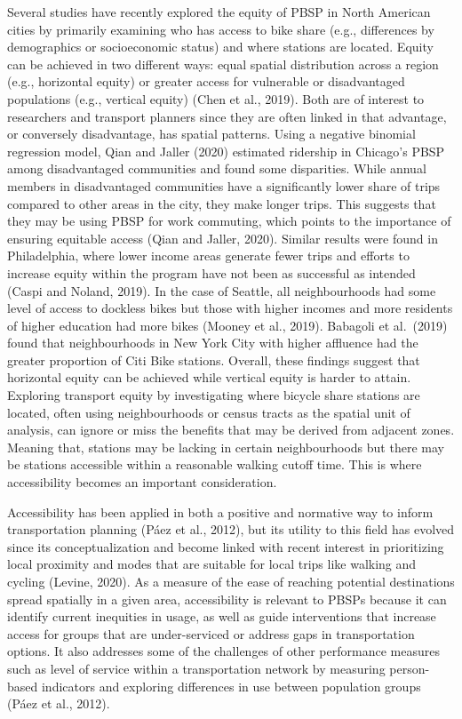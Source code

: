 \documentclass[]{elsarticle} %
\begin{document}
Several studies have recently explored the equity of PBSP in North
American cities by primarily examining who has access to bike share
(e.g., differences by demographics or socioeconomic status) and where
stations are located. Equity can be achieved in two different ways:
equal spatial distribution across a region (e.g., horizontal equity) or
greater access for vulnerable or disadvantaged populations (e.g.,
vertical equity) (Chen et al., 2019). Both are of interest to
researchers and transport planners since they are often linked in that
advantage, or conversely disadvantage, has spatial patterns. Using a
negative binomial regression model, Qian and Jaller (2020) estimated
ridership in Chicago's PBSP among disadvantaged communities and found
some disparities. While annual members in disadvantaged communities have
a significantly lower share of trips compared to other areas in the
city, they make longer trips. This suggests that they may be using PBSP
for work commuting, which points to the importance of ensuring equitable
access (Qian and Jaller, 2020). Similar results were found in
Philadelphia, where lower income areas generate fewer trips and efforts
to increase equity within the program have not been as successful as
intended (Caspi and Noland, 2019). In the case of Seattle, all
neighbourhoods had some level of access to dockless bikes but those with
higher incomes and more residents of higher education had more bikes
(Mooney et al., 2019). Babagoli et al.~(2019) found that neighbourhoods
in New York City with higher affluence had the greater proportion of
Citi Bike stations. Overall, these findings suggest that horizontal
equity can be achieved while vertical equity is harder to attain.
Exploring transport equity by investigating where bicycle share stations
are located, often using neighbourhoods or census tracts as the spatial
unit of analysis, can ignore or miss the benefits that may be derived
from adjacent zones. Meaning that, stations may be lacking in certain
neighbourhoods but there may be stations accessible within a reasonable
walking cutoff time. This is where accessibility becomes an important
consideration.

Accessibility has been applied in both a positive and normative way to
inform transportation planning (Páez et al., 2012), but its utility to
this field has evolved since its conceptualization and become linked
with recent interest in prioritizing local proximity and modes that are
suitable for local trips like walking and cycling (Levine, 2020). As a
measure of the ease of reaching potential destinations spread spatially
in a given area, accessibility is relevant to PBSPs because it can
identify current inequities in usage, as well as guide interventions
that increase access for groups that are under-serviced or address gaps
in transportation options. It also addresses some of the challenges of
other performance measures such as level of service within a
transportation network by measuring person-based indicators and
exploring differences in use between population groups (Páez et al.,
2012).
\end{document}
